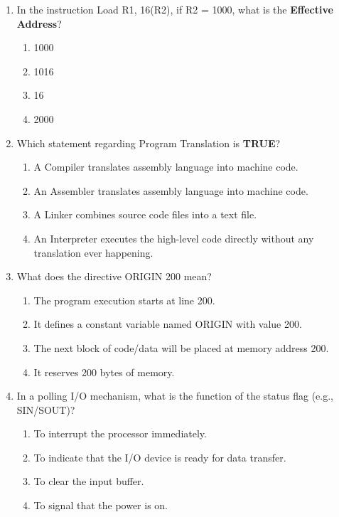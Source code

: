 \documentclass[a4paper,12pt]{article}
\begin{document}
\begin{enumerate}[label=\textbf{\arabic*.}]
    \item In the instruction Load R1, 16(R2), if R2 = 1000, what is the \textbf{Effective Address}?
    \begin{enumerate}[label=\alph*)]
        \item 1000
        \item 1016
        \item 16
        \item 2000
    \end{enumerate}

    \item Which statement regarding Program Translation is \textbf{TRUE}?
    \begin{enumerate}[label=\alph*)]
        \item A Compiler translates assembly language into machine code.
        \item An Assembler translates assembly language into machine code.
        \item A Linker combines source code files into a text file.
        \item An Interpreter executes the high-level code directly without any translation ever happening.
    \end{enumerate}

    \item What does the directive ORIGIN 200 mean?
    \begin{enumerate}[label=\alph*)]
        \item The program execution starts at line 200.
        \item It defines a constant variable named ORIGIN with value 200.
        \item The next block of code/data will be placed at memory address 200.
        \item It reserves 200 bytes of memory.
    \end{enumerate}

    \item In a polling I/O mechanism, what is the function of the status flag (e.g., SIN/SOUT)?
    \begin{enumerate}[label=\alph*)]
        \item To interrupt the processor immediately.
        \item To indicate that the I/O device is ready for data transfer.
        \item To clear the input buffer.
        \item To signal that the power is on.
    \end{enumerate}


\end{enumerate}
\end{document}
